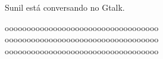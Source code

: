 Sunil está conversando no Gtalk.

ooooooooooooooooooooooooooooooooooo
ooooooooooooooooooooooooooooooooooo
ooooooooooooooooooooooooooooooooooo
